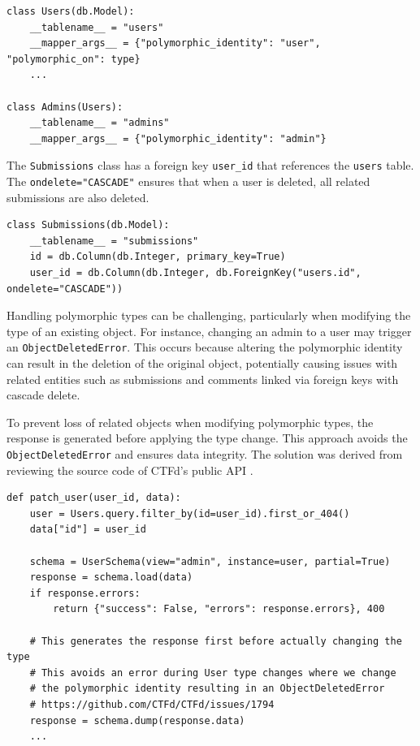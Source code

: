 \begin{verbatim}
class Users(db.Model):
    __tablename__ = "users"
    __mapper_args__ = {"polymorphic_identity": "user", "polymorphic_on": type}
    ...

class Admins(Users):
    __tablename__ = "admins"
    __mapper_args__ = {"polymorphic_identity": "admin"}
\end{verbatim}

The \texttt{Submissions} class has a foreign key \texttt{user\_id} that references the \texttt{users} table. The \texttt{ondelete="CASCADE"} ensures that when a user is deleted, all related submissions are also deleted.

\begin{verbatim}
class Submissions(db.Model):
    __tablename__ = "submissions"
    id = db.Column(db.Integer, primary_key=True)
    user_id = db.Column(db.Integer, db.ForeignKey("users.id", ondelete="CASCADE"))
\end{verbatim}

Handling polymorphic types can be challenging, particularly when modifying the type of an existing object. For instance, changing an admin to a user may trigger an \texttt{ObjectDeletedError}. This occurs because altering the polymorphic identity can result in the deletion of the original object, potentially causing issues with related entities such as submissions and comments linked via foreign keys with cascade delete.

To prevent loss of related objects when modifying polymorphic types, the response is generated before applying the type change. This approach avoids the \texttt{ObjectDeletedError} and ensures data integrity. The solution was derived from reviewing the source code of CTFd's public API \parencite{CTFdUsersAPI}.

\begin{verbatim}
def patch_user(user_id, data):
    user = Users.query.filter_by(id=user_id).first_or_404()
    data["id"] = user_id

    schema = UserSchema(view="admin", instance=user, partial=True)
    response = schema.load(data)
    if response.errors:
        return {"success": False, "errors": response.errors}, 400

    # This generates the response first before actually changing the type
    # This avoids an error during User type changes where we change
    # the polymorphic identity resulting in an ObjectDeletedError
    # https://github.com/CTFd/CTFd/issues/1794
    response = schema.dump(response.data)
    ...
\end{verbatim}

